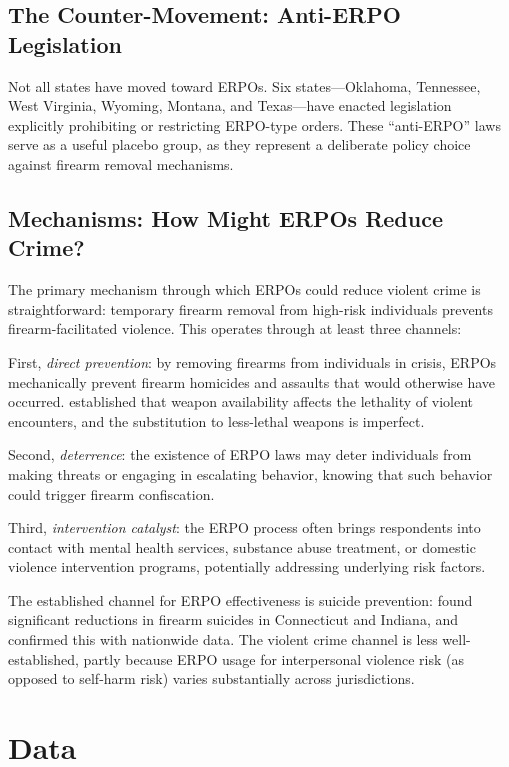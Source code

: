 \documentclass[12pt]{article}
\begin{document}
\subsection{The Counter-Movement: Anti-ERPO Legislation}

Not all states have moved toward ERPOs. Six states---Oklahoma, Tennessee, West Virginia, Wyoming, Montana, and Texas---have enacted legislation explicitly prohibiting or restricting ERPO-type orders. These ``anti-ERPO'' laws serve as a useful placebo group, as they represent a deliberate policy choice against firearm removal mechanisms.

\subsection{Mechanisms: How Might ERPOs Reduce Crime?}

The primary mechanism through which ERPOs could reduce violent crime is straightforward: temporary firearm removal from high-risk individuals prevents firearm-facilitated violence. This operates through at least three channels:

First, \textit{direct prevention}: by removing firearms from individuals in crisis, ERPOs mechanically prevent firearm homicides and assaults that would otherwise have occurred. \citet{cook1979effect} established that weapon availability affects the lethality of violent encounters, and the substitution to less-lethal weapons is imperfect.

Second, \textit{deterrence}: the existence of ERPO laws may deter individuals from making threats or engaging in escalating behavior, knowing that such behavior could trigger firearm confiscation.

Third, \textit{intervention catalyst}: the ERPO process often brings respondents into contact with mental health services, substance abuse treatment, or domestic violence intervention programs, potentially addressing underlying risk factors.

The established channel for ERPO effectiveness is suicide prevention: \citet{kivisto2015effects} found significant reductions in firearm suicides in Connecticut and Indiana, and \citet{deangelis2023red} confirmed this with nationwide data. The violent crime channel is less well-established, partly because ERPO usage for interpersonal violence risk (as opposed to self-harm risk) varies substantially across jurisdictions.


\section{Data}
\end{document}
